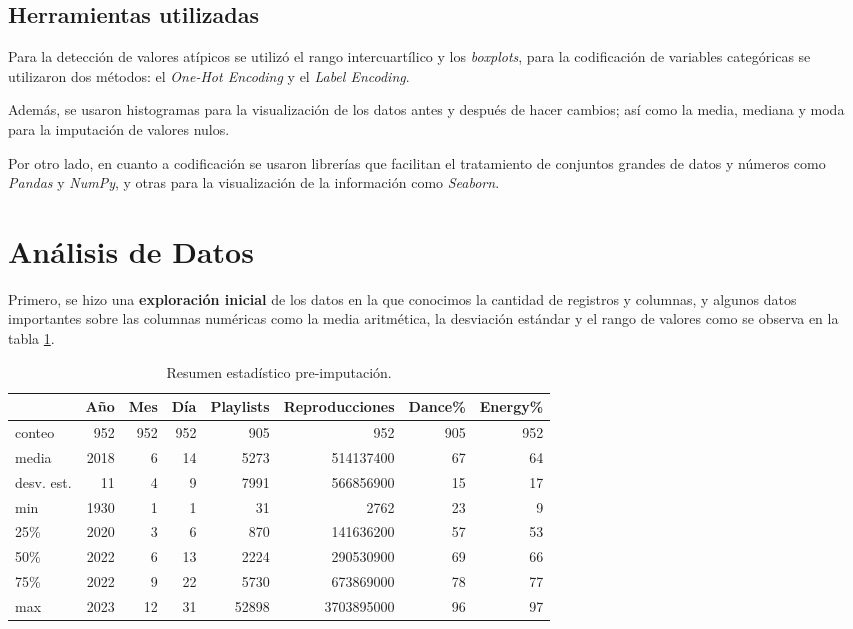 \documentclass{article}
\begin{document}
	\subsection{Herramientas utilizadas}
	Para la detección de valores atípicos se utilizó el rango intercuartílico y los \textit{boxplots}, para la codificación de variables categóricas se utilizaron dos métodos: el \textit{One-Hot Encoding} y el \textit{Label Encoding}.
	
	Además, se usaron histogramas para la visualización de los datos antes y después de hacer cambios; así como la media, mediana y moda para la imputación de valores nulos.
	
	Por otro lado, en cuanto a codificación se usaron librerías que facilitan el tratamiento de conjuntos grandes de datos y números como \textit{Pandas} y \textit{NumPy}, y otras para la visualización de la información como \textit{Seaborn}.
	
	\section{Análisis de Datos}
	Primero, se hizo una \textbf{exploración inicial} de los datos en la que conocimos la cantidad de registros y columnas, y algunos datos importantes sobre las columnas numéricas como la media aritmética, la desviación estándar y el rango de valores como se observa en la tabla \ref{tab:pre-imp}.
	
	\begin{table}[ht]
		\centering
		\begin{tabular}{lrrrrrrr}
			\hline
			& Año & Mes & Día & Playlists & Reproducciones & Dance\% & Energy\% \\
			\hline
			conteo & 952 & 952 & 952 & 905 & 952 & 905 & 952 \\
			media & 2018 & 6 & 14 & 5273 & 514137400 & 67 & 64 \\
			desv. est. & 11 & 4 & 9 & 7991 & 566856900 & 15 & 17 \\
			min & 1930 & 1 & 1 & 31 & 2762 & 23 & 9 \\
			25\% & 2020 & 3 & 6 & 870 & 141636200 & 57 & 53 \\
			50\% & 2022 & 6 & 13 & 2224 & 290530900 & 69 & 66 \\
			75\% & 2022 & 9 & 22 & 5730 & 673869000 & 78 & 77 \\
			max & 2023 & 12 & 31 & 52898 & 3703895000 & 96 & 97 \\
			\hline
		\end{tabular}
		\caption{Resumen estadístico pre-imputación.}
		\label{tab:pre-imp}
	\end{table}
	
\end{document}

